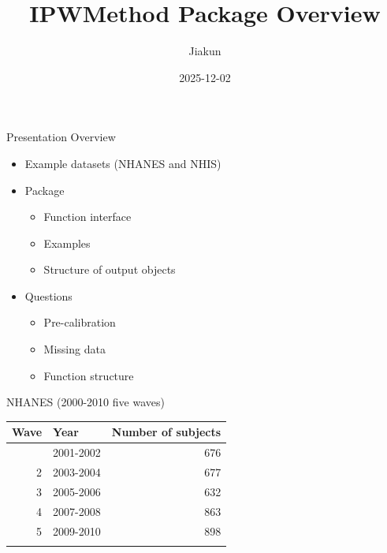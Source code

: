\documentclass[
  ignorenonframetext,
]{beamer}
\title{IPWMethod Package Overview}
\author{Jiakun}
\date{2025-12-02}
\providecommand{\tightlist}{%
  \setlength{\itemsep}{0pt}\setlength{\parskip}{0pt}}
\begin{document}
\frame{\titlepage}

\begin{frame}{Presentation Overview}
\label{presentation-overview}
\begin{itemize}
\item
  Example datasets (NHANES and NHIS)
\item
  Package

  \begin{itemize}
  \tightlist
  \item
    Function interface
  \item
    Examples
  \item
    Structure of output objects
  \end{itemize}
\item
  Questions

  \begin{itemize}
  \tightlist
  \item
    Pre-calibration
  \item
    Missing data
  \item
    Function structure
  \end{itemize}
\end{itemize}
\end{frame}

\begin{frame}{NHANES (2000-2010 five waves)}
\label{nhanes-2000-2010-five-waves}
\begin{longtable}[]{@{}rlr@{}}
\toprule\noalign{}
Wave & Year & Number of subjects \\
\midrule\noalign{}
\endhead
1 & 2001-2002 & 676 \\
2 & 2003-2004 & 677 \\
3 & 2005-2006 & 632 \\
4 & 2007-2008 & 863 \\
5 & 2009-2010 & 898 \\
\bottomrule\noalign{}
\end{longtable}
\end{frame}
\end{document}
